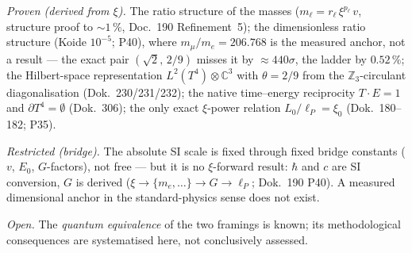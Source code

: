 \emph{Proven (derived from $\xi$).} The ratio structure of the masses ($m_\ell=r_\ell\,\xi^{p_\ell}\,v$, structure proof to ${\sim}1\,\%$, Doc.~190 Refinement~5); the dimensionless ratio structure (Koide $10^{-5}$; P40), where $m_\mu/m_e=206.768$ is the measured anchor, not a result --- the exact pair $(\sqrt2,\,2/9)$ misses it by ${\approx}440\sigma$, the ladder by $0.52\,\%$; the Hilbert-space representation $L^2(T^4)\otimes\mathbb{C}^3$ with $\theta=2/9$ from the $\mathbb{Z}_3$-circulant diagonalisation (Dok.~230/231/232); the native time--energy reciprocity $T\cdot E=1$ and $\partial T^4=\emptyset$ (Dok.~306); the only exact $\xi$-power relation $L_0/\ell_P=\xi_0$ (Dok.~180--182; P35).

\emph{Restricted (bridge).} The absolute SI scale is fixed through fixed bridge constants ($v$, $E_0$, $G$-factors), not free --- but it is no $\xi$-forward result: $\hbar$ and $c$ are SI conversion, $G$ is derived ($\xi\to\{m_e,\dots\}\to G\to\ell_P$; Dok.~190 P40). A measured dimensional anchor in the standard-physics sense does not exist.

\emph{Open.} The \emph{quantum equivalence} of the two framings is known; its methodological consequences are systematised here, not conclusively assessed.
